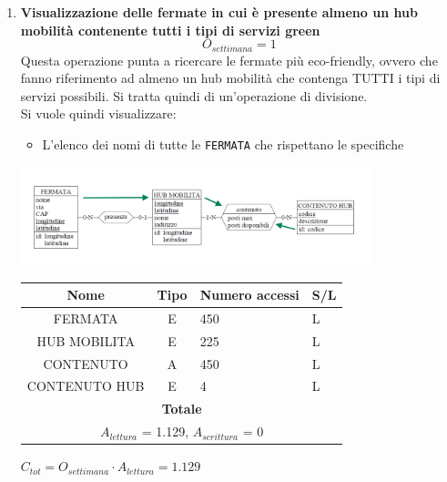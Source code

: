 \documentclass[12pt,a4paper]{report}
\begin{document}
\begin{enumerate}[label=\textbf{\arabic*}]
    \item\textbf{Visualizzazione delle fermate in cui è presente almeno un hub mobilità contenente tutti i tipi di servizi green} \label{op18} \\
    \[ {O_{settimana} = 1} \]
    Questa operazione punta a ricercare le fermate più eco-friendly, ovvero che fanno riferimento ad almeno un hub mobilità che contenga TUTTI i tipi di servizi possibili. Si tratta quindi di un'operazione di divisione. \\
    Si vuole quindi visualizzare:
    \begin{itemize}
	\renewcommand\labelitemi{--}
    \item L'elenco dei nomi di tutte le \texttt{FERMATA} che rispettano le specifiche
    \end{itemize}
    \begin{center}
    \includegraphics[width=0.8\textwidth]{VisualFermateHubCompleti}
    \end{center}
    \begin{table}[H]
    \centering
    \begin{tabular}{|c|c|l|l|}
    \hline
    \textbf{Nome} & \textbf{Tipo} & \textbf{Numero accessi} & \textbf{S/L} \\
    \hline
    FERMATA & E & 450 & L \\
    \hline
    HUB MOBILITA & E & 225 & L \\
    \hline
    CONTENUTO & A & 450 & L \\
    \hline
    CONTENUTO HUB & E & 4 & L \\
    \hline
    \multicolumn{4}{c}{\textbf{Totale}} \\
    \multicolumn{4}{c}{${A_{lettura}}$ = 1.129, ${A_{scrittura}}$ = 0} \\
    \hline
    \end{tabular}
    \end{table}
    \begin{center}
    ${C_{tot} = {O_{settimana}}\cdot{A_{lettura}}= 1.129}$
    \end{center}



\end{enumerate}
\end{document}
